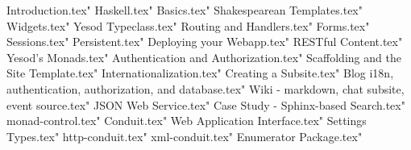 \documentclass{book}
\begin{document}
 Introduction.tex"
 Haskell.tex"
 Basics.tex"
 Shakespearean Templates.tex"
 Widgets.tex"
 Yesod Typeclass.tex"
 Routing and Handlers.tex"
 Forms.tex"
 Sessions.tex"
 Persistent.tex"
 Deploying your Webapp.tex"
 RESTful Content.tex"
 Yesod's Monads.tex"
 Authentication and Authorization.tex"
 Scaffolding and the Site Template.tex"
 Internationalization.tex"
 Creating a Subsite.tex"
 Blog i18n, authentication, authorization, and database.tex"
 Wiki - markdown, chat subsite, event source.tex"
 JSON Web Service.tex"
 Case Study - Sphinx-based Search.tex"
 monad-control.tex"
 Conduit.tex"
 Web Application Interface.tex"
 Settings Types.tex"
 http-conduit.tex"
 xml-conduit.tex"
 Enumerator Package.tex"
\end{document}
